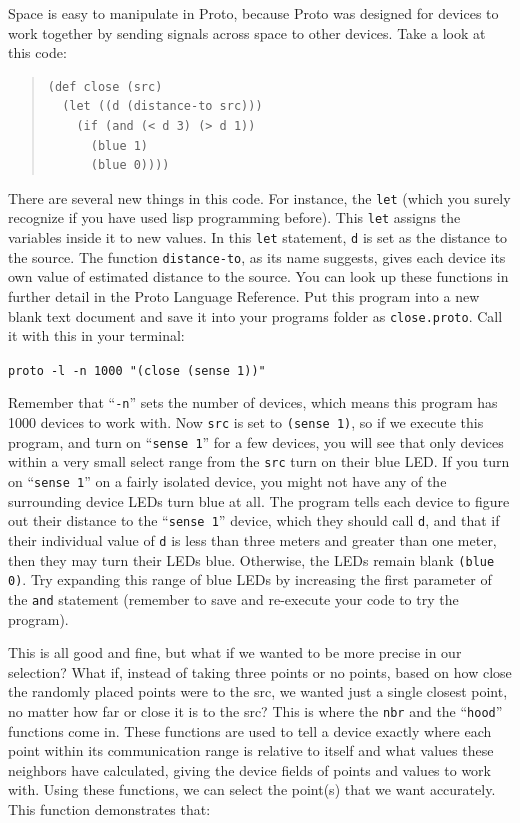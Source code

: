 \documentclass{article}
\newcommand\code[1]{\begin{center}\var{#1}\end{center}}
\newcommand\var[1]{{\tt #1}}
\newcommand\qvar[1]{``{\tt #1}''}
\begin{document}
Space is easy to manipulate in Proto, because Proto was designed for
devices to work together by sending signals across space to other
devices.  Take a look at this code:

\begin{quote}
\begin{verbatim}
(def close (src) 
  (let ((d (distance-to src)))
    (if (and (< d 3) (> d 1)) 
      (blue 1) 
      (blue 0))))
\end{verbatim}
\end{quote}

There are several new things in this code. For instance, the \var{let}
(which you surely recognize if you have used lisp programming before).
This \var{let} assigns the variables inside it to new values.  In this
\var{let} statement, \var{d} is set as the distance to the source.
The function \var{distance-to}, as its name suggests, gives each
device its own value of estimated distance to the source.  You can
look up these functions in further detail in the Proto Language
Reference.  Put this program into a new blank text document and save
it into your programs folder as \var{close.proto}. Call it with this
in your terminal:

\code{proto -l -n 1000 "(close (sense 1))"}

Remember that \qvar{-n} sets the number of devices, which means this
program has 1000 devices to work with. Now \var{src} is set to
\var{(sense 1)}, so if we execute this program, and turn on
\qvar{sense 1} for a few devices, you will see that only devices
within a very small select range from the \var{src} turn on their blue
LED.  If you turn on \qvar{sense 1} on a fairly isolated device, you
might not have any of the surrounding device LEDs turn blue at all.
The program tells each device to figure out their distance to the
\qvar{sense 1} device, which they should call \var{d}, and that if
their individual value of \var{d} is less than three meters and
greater than one meter, then they may turn their LEDs blue.
Otherwise, the LEDs remain blank \var{(blue 0)}.  Try expanding this
range of blue LEDs by increasing the first parameter of the \var{and}
statement (remember to save and re-execute your code to try the
program).

This is all good and fine, but what if we wanted to be more precise in
our selection?  What if, instead of taking three points or no points,
based on how close the randomly placed points were to the src, we
wanted just a single closest point, no matter how far or close it is
to the src?  This is where the \var{nbr} and the \qvar{hood} functions
come in.  These functions are used to tell a device exactly where each
point within its communication range is relative to itself and what
values these neighbors have calculated, giving the device fields of
points and values to work with. Using these functions, we can select
the point(s) that we want accurately. This function demonstrates that:
\end{document}
